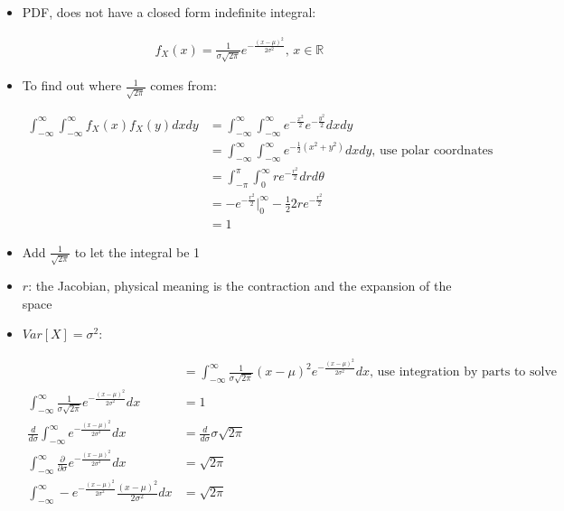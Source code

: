 \documentclass[11pt,letterpaper,titlepage]{article}
\begin{document}
\begin{itemize}
    
    \item PDF, does not have a closed form indefinite integral:
    
    \begin{equation*}
        \begin{aligned}
            f_X(x) = \frac{1}{\sigma \sqrt{2\pi}} e^{-\frac{(x-\mu)^2}{2\sigma^2}} \text{, } x \in \mathbb{R}
        \end{aligned}
    \end{equation*}
    
    \item To find out where $\frac{1}{\sqrt{2\pi}}$ comes from:
    
    \begin{equation*}
        \begin{aligned}
            \int_{-\infty}^{\infty} \int_{-\infty}^{\infty} f_X(x) f_X(y) dx dy &= \int_{-\infty}^{\infty} \int_{-\infty}^{\infty} e^{-\frac{x^2}{2}} e^{-\frac{y^2}{2}} dx dy \\
            &= \int_{-\infty}^{\infty} \int_{-\infty}^{\infty} e^{-\frac{1}{2}(x^2 + y^2)} dx dy \text{, use polar coordnates}\\
            &= \int_{-\pi}^{\pi} \int_{0}^{\infty} r e^{-\frac{r^2}{2}} dr d\theta \\
            &= -e^{-\frac{r^2}{2}}\big|_{0}^{\infty} - \frac{1}{2} 2r e^{-\frac{r^2}{2}} \\
            &= 1
        \end{aligned}
    \end{equation*}
    
    \item Add $\frac{1}{\sqrt{2\pi}}$ to let the integral be 1
    
    \item $r$: the Jacobian, physical meaning is the contraction and the expansion of the space
    
    \item $Var[X] = \sigma^2$:
    
    \begin{equation*}
        \begin{aligned}
            &=\int_{-\infty}^{\infty} \frac{1}{\sigma \sqrt{2\pi}} (x - \mu)^2 e^{-\frac{(x-\mu)^2}{2\sigma^2}} dx \text{, use integration by parts to solve} \\
            \int_{-\infty}^{\infty} \frac{1}{\sigma \sqrt{2\pi}} e^{-\frac{(x-\mu)^2}{2\sigma^2}} dx &= 1 \\
            \frac{d}{d\sigma} \int_{-\infty}^{\infty} e^{-\frac{(x-\mu)^2}{2\sigma^2}} dx &= \frac{d}{d\sigma} \sigma \sqrt{2\pi} \\
            \int_{-\infty}^{\infty} \frac{\partial}{\partial \sigma} e^{-\frac{(x-\mu)^2}{2\sigma^2}} dx &= \sqrt{2\pi} \\
            \int_{-\infty}^{\infty} - e^{-\frac{(x-\mu)^2}{2\sigma^2}} \frac{(x-\mu)^2}{2\sigma^2} dx &= \sqrt{2\pi}
        \end{aligned}
    \end{equation*}
    
\end{itemize}
\end{document}

